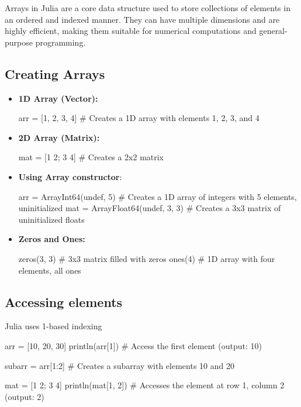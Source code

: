 \documentclass{report}
\begin{document}
    \pagebreak 
    \bigbreak \noindent 
    Arrays in Julia are a core data structure used to store collections of elements in an ordered and indexed manner. They can have multiple dimensions and are highly efficient, making them suitable for numerical computations and general-purpose programming.
    \bigbreak \noindent 
    \subsection{Creating Arrays}
    \bigbreak \noindent 
    \begin{itemize}
        \item \textbf{1D Array (Vector):}
            \bigbreak \noindent 
            \begin{jlcode}
            arr = [1, 2, 3, 4]  # Creates a 1D array with elements 1, 2, 3, and 4
            \end{jlcode}
        \item \textbf{2D Array (Matrix):}
            \bigbreak \noindent 
            \begin{jlcode}
                mat = [1 2; 3 4]  # Creates a 2x2 matrix
            \end{jlcode}
        \item \textbf{Using Array constructor}:
            \bigbreak \noindent 
            \begin{jlcode}
            arr = Array{Int64}(undef, 5)  # Creates a 1D array of integers with 5 elements, uninitialized
            mat = Array{Float64}(undef, 3, 3)  # Creates a 3x3 matrix of uninitialized floats
            \end{jlcode}
        \item \textbf{Zeros and Ones:}
            \begin{jlcode}
            zeros(3, 3)  # 3x3 matrix filled with zeros
            ones(4)      # 1D array with four elements, all ones
            \end{jlcode}
    \end{itemize}
    \bigbreak \noindent 
    \subsection{Accessing elements}
    \bigbreak \noindent 
    Julia uses 1-based indexing
    \bigbreak \noindent 
    \begin{jlcode}
    arr = [10, 20, 30]
    println(arr[1])  # Access the first element (output: 10)

    subarr = arr[1:2]  # Creates a subarray with elements 10 and 20

    mat = [1 2; 3 4]
    println(mat[1, 2])  # Accesses the element at row 1, column 2 (output: 2)
    \end{jlcode}
\end{document}
